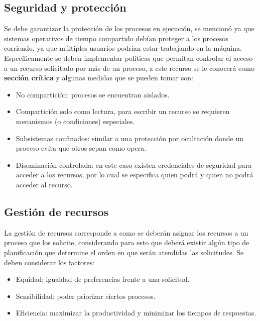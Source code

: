 \subsection{Seguridad y protección}
Se debe garantizar la protección de los procesos en ejecución, se mencionó ya
que sistemas operativos de tiempo compartido debían proteger a los procesos
corriendo, ya que múltiples usuarios podrían estar trabajando en la máquina.
Específicamente se deben implementar políticas que permitan controlar el acceso
a un recurso solicitado por más de un proceso, a este recurso se le conocerá
como \textbf{sección crítica} y algunas medidas que se pueden tomar son:

\begin{itemize}

	\item No compartición: procesos se encuentran aislados.

	\item Compartición solo como lectura, para escribir un recurso se
	requieren mecanismos (o condiciones) especiales.

	\item Subsistemas confinados: similar a una protección por ocultación
	donde un proceso evita que otros sepan como opera.

	\item Diseminación controlada: en este caso existen credenciales de
	seguridad para acceder a los recursos, por lo cual se especifica quien
	podrá y quien no podrá acceder al recurso.

\end{itemize}

\subsection{Gestión de recursos}
La gestión de recursos corresponde a como se deberán asignar los recursos a un
proceso que los solicite, considerando para esto que deberá existir algún tipo
de planificación que determine el orden en que serán atendidas las solicitudes.
Se deben considerar los factores:

\begin{itemize}

	\item Equidad: igualdad de preferencias frente a una solicitud.

	\item Sensibilidad: poder priorizar ciertos procesos.

	\item Eficiencia: maximizar la productividad y minimizar los tiempos de
	respuestas.

\end{itemize}

